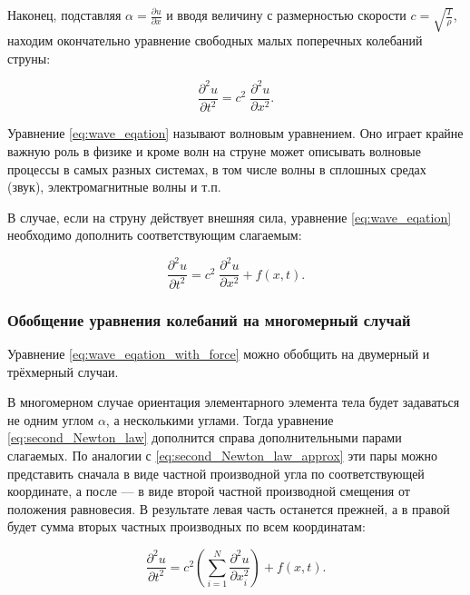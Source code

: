 \documentclass[12pt,a4paper,russian]{report}
\begin{document}
	Наконец, подставляя $\alpha = \frac{\partial u}{\partial x}$ и вводя величину с размерностью скорости $c = \sqrt{\frac{T}{\rho}}$, находим окончательно уравнение свободных малых поперечных колебаний струны:  
	
	\begin{equation} \label{eq:wave_eqation}
		\frac{\partial^2 u}{\partial t^2} = c^2 \; \frac{\partial^2 u}{\partial x^2}.
	\end{equation}

	Уравнение \eqref{eq:wave_eqation} называют волновым уравнением. Оно играет крайне важную роль в физике и кроме волн на струне может описывать волновые процессы в самых разных системах, в том числе волны в сплошных средах (звук), электромагнитные волны и т.п.
	
	В случае, если на струну действует внешняя сила, уравнение \eqref{eq:wave_eqation} необходимо дополнить соответствующим слагаемым:
	
	\begin{equation} \label{eq:wave_eqation_with_force}
		\frac{\partial^2 u}{\partial t^2} = c^2 \; \frac{\partial^2 u}{\partial x^2} + f(x, t).
	\end{equation}
	
	\subsubsection{Обобщение уравнения колебаний на многомерный случай}
	
	
	Уравнение \eqref{eq:wave_eqation_with_force} можно обобщить на двумерный и трёхмерный случаи.  
	
	В многомерном случае ориентация элементарного элемента тела будет задаваться не одним углом $\alpha$, а несколькими углами. Тогда уравнение \eqref{eq:second_Newton_law} дополнится справа дополнительными парами слагаемых. По аналогии с \eqref{eq:second_Newton_law_approx} эти пары можно представить сначала в виде частной производной угла по соответствующей координате, а после --- в виде второй частной производной смещения от положения равновесия. В результате левая часть останется прежней, а в правой будет сумма вторых частных производных по всем координатам:
	
	\begin{equation} \label{eq:wave_eqation_with_force_multidimension}
		\frac{\partial^2 u}{\partial t^2} = c^2 \left(  \sum_{i=1}^{N} \frac{\partial^2 u}{\partial x_i^2} \right) + f(x, t).
	\end{equation}
	
\end{document}
